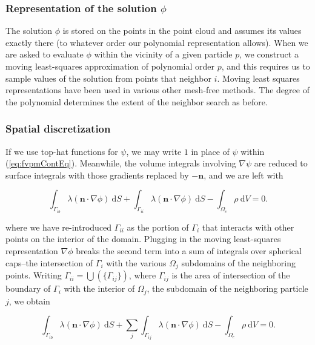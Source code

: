 \documentclass[12pt]{article}
\newcommand{\labelEq}[1]{\label{eq:#1}}
\newcommand{\refEq}[1]{(\ref{eq:#1})}
\renewcommand{\vec}[1]{\mathbf{#1}}
\newcommand{\grad}[1]{\nabla#1}
\newcommand{\dV}{~\mathrm{d}V}
\newcommand{\dS}{~\mathrm{d}S}
\begin{document}
\subsubsection*{Representation of the solution $\phi$}

The solution $\phi$ is stored on the points in the point cloud and assumes its values exactly there (to whatever order our polynomial 
representation allows). When we are asked to evaluate $\phi$ within the vicinity of a given particle $p$, we construct a moving least-squares 
approximation of polynomial order $p$, and this requires us to sample values of the solution from points that neighbor $i$. 
Moving least squares representations have been used in various other mesh-free methods\cite{Dilts1999}.
The degree of the polynomial determines the extent of the neighbor search as before.

\subsubsection*{Spatial discretization}

If we use top-hat functions for $\psi$, we may write $1$ in place of $\psi$ within \refEq{fvpmContEq}.
Meanwhile, the volume integrals involving $\grad{\psi}$ are reduced to surface integrals with those 
gradients replaced by $-\vec{n}$, and we are left with

\begin{equation}
\int_{\Gamma_{ib}} \lambda (\vec{n}\cdot\grad{\phi}) \dS + 
\int_{\Gamma_{ii}} \lambda (\vec{n}\cdot\grad{\phi}) \dS - 
\int_{\Omega_c} \rho \dV = 0. \labelEq{fvpmEqTopHat}
\end{equation}

\noindent
where we have re-introduced $\Gamma_{ii}$ as the portion of $\Gamma_i$ that interacts with other points on the 
interior of the domain. Plugging in the moving least-squares representation $\grad{\phi}$
breaks the second term into a sum of integrals over spherical caps--the intersection of $\Gamma_i$ with the various $\Omega_j$ subdomains of 
the neighboring points. Writing $\Gamma_{ii} = \bigcup(\{\Gamma_{ij}\})$, where $\Gamma_{ij}$ is the area of intersection of the boundary of $\Gamma_i$
with the interior of $\Omega_j$, the subdomain of the neighboring particle $j$, we obtain

\begin{equation}
\int_{\Gamma_{ib}} \lambda (\vec{n}\cdot\grad{\phi}) \dS + 
\sum_j \int_{\Gamma_{ij}} \lambda (\vec{n}\cdot\grad{\phi}) \dS -
\int_{\Omega_c} \rho \dV = 0. \labelEq{fvpmEqTopHat}
\end{equation}
\end{document}
